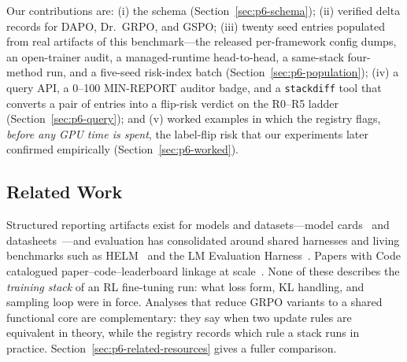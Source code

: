 Our contributions are:
(i) the schema (Section~\ref{sec:p6-schema});
(ii) verified delta records for DAPO, Dr.~GRPO, and GSPO;
(iii) twenty seed entries populated from real artifacts of this benchmark---the
released per-framework config dumps, an open-trainer audit, a
managed-runtime head-to-head, a same-stack four-method run, and a five-seed
risk-index batch (Section~\ref{sec:p6-population});
(iv) a query API, a 0--100 MIN-REPORT auditor badge, and a \texttt{stackdiff}
tool that converts a pair of entries into a flip-risk verdict on the R0--R5
ladder (Section~\ref{sec:p6-query}); and
(v) worked examples in which the registry flags, \emph{before any GPU time is
spent}, the label-flip risk that our experiments later confirmed empirically
(Section~\ref{sec:p6-worked}).

\subsection{Related Work}
\label{sec:p6-related}
Structured reporting artifacts exist for models and
datasets---model cards~\citep{mitchell2019modelcards} and
datasheets~\citep{gebru2021datasheets}---and evaluation has consolidated around
shared harnesses and living benchmarks such as HELM~\citep{liang2022helm} and
the LM Evaluation Harness~\citep{gao2021harness, biderman2024lessons}. Papers
with Code catalogued paper--code--leaderboard linkage at
scale~\citep{paperswithcode2025}. None of these describes the \emph{training
stack} of an RL fine-tuning run: what loss form, KL handling, and sampling loop
were in force. Analyses that reduce GRPO variants to a shared functional core
\citep{wu2025grpo_dpo, liu2026gdpo} are complementary: they say when two update
rules are equivalent in theory, while the registry records which rule a stack
runs in practice. Section~\ref{sec:p6-related-resources} gives a fuller
comparison.
